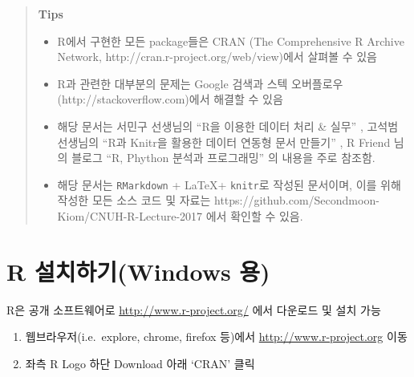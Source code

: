 \documentclass[11pt,a4paper]{book}
\providecommand{\tightlist}{%
  \setlength{\itemsep}{0pt}\setlength{\parskip}{0pt}}
\newcommand{\latex}{\LaTeX\xspace}
\theoremstyle{definition}
\theoremstyle{definition}
\theoremstyle{definition}
\theoremstyle{remark}
\begin{document}
\begin{quote}
\colorbox{gray!10}{\begin{minipage}{15cm}
\textbf{Tips}
  \begin{itemize}
    \item R에서 구현한 모든 package들은 CRAN (The Comprehensive R Archive Network, http://cran.r-project.org/web/view)에서 살펴볼 수 있음
    \item R과 관련한 대부분의 문제는 Google 검색과 스텍 오버플로우(http://stackoverflow.com)에서 해결할 수 있음
    \item 해당 문서는 서민구 선생님의 ``R을 이용한 데이터 처리 \& 실무'' \citep{Seo-2014}, 고석범 선생님의 ``R과 Knitr을 활용한 데이터 연동형 문서 만들기'' \citep{Ko-2014}, R Friend 님의 블로그 ``R, Phython 분석과 프로그래밍'' \citep{R-Friend} 의 내용을 주로 참조함. 
    \item 해당 문서는 \texttt{RMarkdown} + \latex + \texttt{knitr}로 작성된 문서이며, 이를 위해 작성한 모든 소스 코드 및 자료는 https://github.com/Secondmoon-Kiom/CNUH-R-Lecture-2017 에서 확인할 수 있음. 
  \end{itemize}
\end{minipage}}
\end{quote}

\newpage

\section{R 설치하기(Windows 용)}\label{r-windows-}

R은 공개 소프트웨어로 \url{http://www.r-project.org/} 에서 다운로드 및
설치 가능

\begin{enumerate}
\def\labelenumi{\arabic{enumi}.}
\tightlist
\item
  웹브라우저(i.e.~explore, chrome, firefox 등)에서
  \url{http://www.r-project.org} 이동
\item
  좌측 R Logo 하단 Download 아래 `CRAN' 클릭
\end{enumerate}
\end{document}
